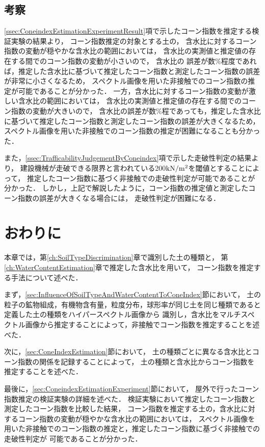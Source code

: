 \clearpage

\subsection{考察}
\label{ssec:ConeindexEstimationExperimentConsideration}

\ref{ssec:ConeindexEstimationExperimentResult}項で示したコーン指数を推定する検証実験の結果より，
コーン指数推定の対象とする土の，
含水比に対するコーン指数の変動が穏やかな含水比の範囲においては，
含水比の実測値と推定値の存在する間でのコーン指数の変動が小さいので，
含水比の
誤差が数$\%$程度であれば，推定した含水比に基づいて推定したコーン指数と測定したコーン指数の誤差が非常に小さくなるため，
スペクトル画像を用いた非接触でのコーン指数の推定が可能であることが分かった．
一方，含水比に対するコーン指数の変動が激しい含水比の範囲においては，
含水比の実測値と推定値の存在する間でのコーン指数の変動が大きいので，
含水比の誤差が数$\%$程であっても，推定した含水比に基づいて推定したコーン指数と測定したコーン指数の誤差が大きくなるため，
スペクトル画像を用いた非接触でのコーン指数の推定が困難になることも分かった．

また，\ref{ssec:TrafficabilityJudgementByConeindex}項で示した走破性判定の結果より，
建設機械が走破できる限界と言われている200${\rm kN/m^2}$を閾値とすることによって，
推定したコーン指数に基づく非接触での走破性判定が可能であることが分かった．
しかし，上記で解説したように，コーン指数の推定値と測定したコーン指数の誤差が大きくなる場合には，
走破性判定が困難になる．

\clearpage


\section{おわりに}

本章では，第\ref{ch:SoilTypeDiscrimination}章で識別した土の種類と，
第\ref{ch:WaterContentEstimation}章で推定した含水比を用いて，
コーン指数を推定する手法について述べた．

まず，\ref{sec:InfluenceOfSoilTypeAndWaterContentToConeIndex}節において，
土の粒子の鉱物組成，有機物含有量，粒度分布，球形率が同じ土を同じ種類であると定義した土の種類をハイパースペクトル画像から
識別し，含水比をマルチスペクトル画像から推定することによって，非接触でコーン指数を推定することを述べた．

次に，\ref{sec:ConeIndexEstimation}節において，
土の種類ごとに異なる含水比とコーン指数の関係を記録することによって，
土の種類と含水比からコーン指数を推定することを述べた．

最後に，\ref{sec:ConeindexEstimationExperiment}節において，
屋外で行ったコーン指数推定の検証実験の詳細を述べた．
検証実験において推定したコーン指数と測定したコーン指数を比較した結果，
コーン指数を推定する土の，含水比に対するコーン指数の変動が穏やかな含水比の範囲においては，
スペクトル画像を用いた非接触でのコーン指数の推定と，推定したコーン指数に基づく非接触での走破性判定が
可能であることが分かった．

\newpage
